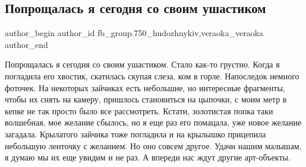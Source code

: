  
 
 
 
 

\subsection{Попрощалась я сегодня со своим ушастиком}
\label{sec:22_04_2018.fb.fb_group.750_hudozhnykiv.1.poproschalas_ja_segodnja_so_svoim_ushastikom}
 
\ifcmt
 author_begin
   author_id fb_group.750_hudozhnykiv,veraoka_veraoka
 author_end
\fi

Попрощалась я сегодня со своим ушастиком. Стало как-то грустно. Когда я
погладила его хвостик, скатилась скупая слеза, ком в горле. Напоследок немного
фоточек. На некоторых зайчиках есть небольшие, но интересные фрагменты, чтобы
их снять на камеру, пришлось становиться на цыпочки, с моим метр в кепке не так
просто было все рассмотреть. Кстати, золотистая попка таки волшебная, мое
желание сбылось, но я еще раз его помацала, уже новое желание загадала.
Крылатого зайчика тоже погладила и на крылышко прицепила небольшую ленточку с
желанием. Но оно совсем другое. Удачи нашим малышам, я думаю мы их еще увидим и
не раз. А впереди нас ждут другие арт-объекты.

